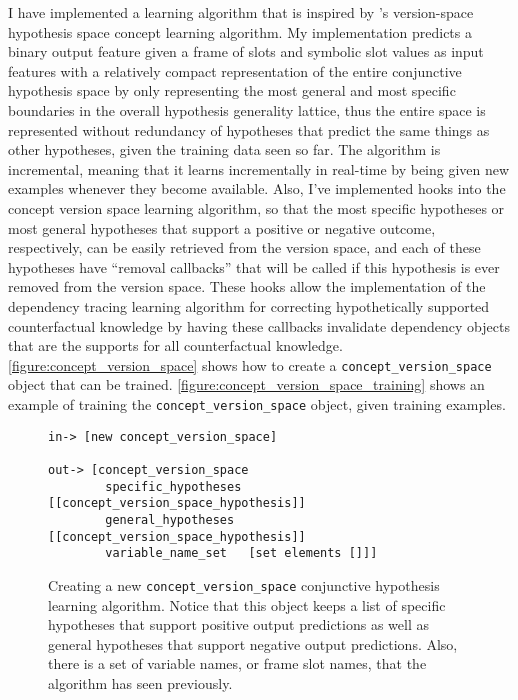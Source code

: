 I have implemented a learning algorithm that is inspired by
\citeauthor{mitchell:1997}'s \citeyear{mitchell:1997} version-space
hypothesis space concept learning algorithm.  My implementation
predicts a binary output feature given a frame of slots and symbolic
slot values as input features with a relatively compact representation
of the entire conjunctive hypothesis space by only representing the
most general and most specific boundaries in the overall hypothesis
generality lattice, thus the entire space is represented without
redundancy of hypotheses that predict the same things as other
hypotheses, given the training data seen so far.  The algorithm is
incremental, meaning that it learns incrementally in real-time by
being given new examples whenever they become available.  Also, I've
implemented hooks into the concept version space learning algorithm,
so that the most specific hypotheses or most general hypotheses that
support a positive or negative outcome, respectively, can be easily
retrieved from the version space, and each of these hypotheses have
``removal callbacks'' that will be called if this hypothesis is ever
removed from the version space.  These hooks allow the implementation
of the dependency tracing learning algorithm for correcting
hypothetically supported counterfactual knowledge by having these
callbacks invalidate dependency objects that are the supports for all
counterfactual knowledge.
{\mbox{\autoref{figure:concept_version_space}}} shows how to create a
{\tt{concept\_version\_space}} object that can be trained.
{\mbox{\autoref{figure:concept_version_space_training}}} shows an
example of training the {\tt{concept\_version\_space}} object, given
training examples.
\begin{figure}[h]
\centering
{\small
\begin{Verbatim}[frame=single]
 in-> [new concept_version_space]

out-> [concept_version_space
        specific_hypotheses [[concept_version_space_hypothesis]]
        general_hypotheses  [[concept_version_space_hypothesis]]
        variable_name_set   [set elements []]]
\end{Verbatim}
}
\caption[Creating a new {\tt{concept\_version\_space}} conjunctive
  hypothesis learning algorithm.]{Creating a new
  {\tt{concept\_version\_space}} conjunctive hypothesis learning
  algorithm.  Notice that this object keeps a list of specific
  hypotheses that support positive output predictions as well as
  general hypotheses that support negative output predictions.  Also,
  there is a set of variable names, or frame slot names, that the
  algorithm has seen previously.}
\label{figure:concept_version_space}
\end{figure}
